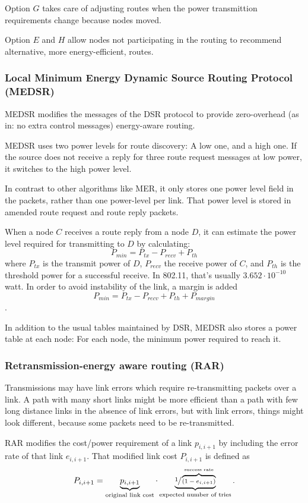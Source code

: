 \documentclass[conference]{IEEEtran}
\begin{document}
Option $G$ takes care of adjusting routes when the power transmittion requirements
change because nodes moved.

Option $E$ and $H$ allow nodes not participating in the routing to recommend
alternative, more energy-efficient, routes.
\subsubsection{Local Minimum Energy Dynamic Source Routing Protocol (MEDSR)}
MEDSR\cite{tanque2007minimum} modifies the messages of the DSR protocol to
provide zero-overhead (as in: no extra control messages) energy-aware routing.

MEDSR uses two power levels for route discovery: A low one, and a high one. If
the source does not receive a reply for three route request messages at low
power, it switches to the high power level.

In contrast to other algorithms like MER, it only stores one power level field
in the packets, rather than one power-level per link. That power level is stored
in amended route request and route reply packets.

When a node $C$ receives a route reply from a node $D$, it can estimate the
power level required for transmitting to $D$ by calculating:
\[ P_{min} = P_{tx} - P_{recv} + P_{th} \]
where $P_{tx}$ is the transmit power of $D$, $P_{recv}$ the receive power of $C$,
and $P_{th}$ is the threshold power for a successful receive. In 802.11, that's
usually $3.652 \cdot 10^{-10}$ watt. In order to avoid instability of the link, a margin is added
\[ P_{min} = P_{tx} - P_{recv} + P_{th} + P_{margin}\].{}

In addition to the usual tables maintained by DSR, MEDSR also stores a power
table at each node: For each node, the minimum power required to reach it.

\subsubsection{Retransmission-energy aware routing (RAR)}
Transmissions may have link errors which require re-transmitting packets over
a link. A path with many short links might be more efficient than a path with
few long distance links in the absence of link errors, but with link errors,
things might look different, because some packets need to be re-transmitted.

RAR\cite{banerjee2002minimum} modifies the cost/power requirement of a link $p_{i,i+1}$ by including the error rate of that
link $e_{i,i+1}$. That modified link cost $P_{i,i+1}$ is defined as
\[ P_{i,i+1} = \underbrace{p_{i,i+1}}_{\text{original link cost}} \cdot \underbrace{\sfrac{1}{\overbrace{(1-e_{i,i+1})}^{\text{success rate}}}}_{\text{expected number of tries}}. \]
\end{document}
